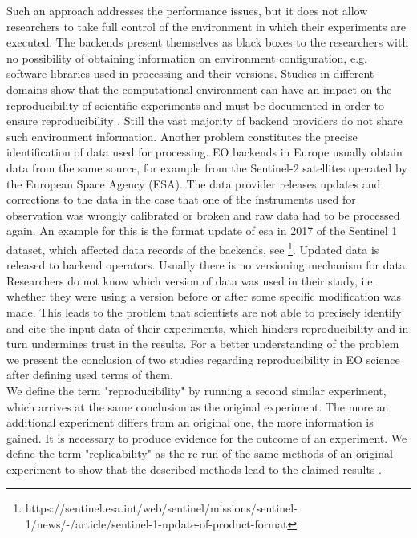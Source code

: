 \documentclass[draft,final]{vutinfth} %
\newcommand{\bgoesswein}[1]{{\color{blue}#1}}
\newcommand{\bgoessweindel}[1]{{\color{red}#1}}
\begin{document}
Such an approach addresses the performance issues, but it does not allow researchers to take full control of the environment in which their experiments are executed. The backends present themselves as black boxes to the researchers with no possibility of obtaining information on environment configuration, e.g. software libraries used in processing and their versions. Studies in different domains show that the computational environment can have an impact on the reproducibility of scientific experiments and must be documented in order to ensure reproducibility \cite{Freesurfer} \cite{Thestateofreproducibility}  \cite{MiksaBiomedical}. Still the vast majority of backend providers do not share such environment information. Another problem constitutes the precise identification of data used for processing. EO backends in Europe usually obtain data from the same source, for example from the Sentinel-2 satellites operated by the European Space Agency (ESA). The data provider releases updates and corrections to the data in the case that one of the instruments used for observation was wrongly calibrated or broken and raw data had to be processed again. An example for this is the format update of \gls{esa} in 2017 of the Sentinel 1 dataset, which affected data records of the backends, see \footnote{https://sentinel.esa.int/web/sentinel/missions/sentinel-1/news/-/article/sentinel-1-update-of-product-format}. Updated data is released to backend operators. Usually there is no versioning mechanism for data. Researchers do not know which version of data was used in their study, i.e. whether they were using a version before or after some specific modification was made. This leads to the problem that scientists are not able to precisely identify and cite the input data of their experiments, which hinders reproducibility and in turn undermines trust in the results. For a better understanding of the problem we present the conclusion of two studies regarding reproducibility in EO science after defining used terms of them. \\
We define the term "reproducibility" by running a second \bgoesswein{similar} \gls{experiment}, which arrives at the same conclusion as the original experiment. \bgoessweindel{The more an additional experiment differs from an original one, the more information is gained.} It is necessary to produce evidence for the outcome of an experiment. We define the term "replicability" as the re-run of the same methods of an original experiment to show that the described methods lead to the claimed results \cite{reprovsrepli}. \\
\end{document}
